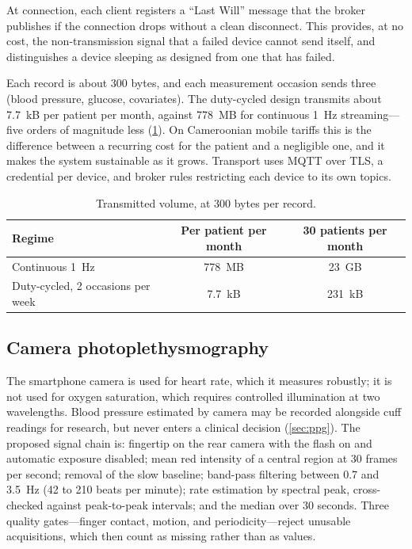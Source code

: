 At connection, each client registers a ``Last Will'' message that the broker publishes if the connection drops without a clean disconnect. This provides, at no cost, the non-transmission signal that a failed device cannot send itself, and distinguishes a device sleeping as designed from one that has failed.

Each record is about 300 bytes, and each measurement occasion sends three (blood pressure, glucose, covariates). The duty-cycled design transmits about 7.7~kB per patient per month, against 778~MB for continuous 1~Hz streaming---five orders of magnitude less (\cref{tab:data-volume}). On Cameroonian mobile tariffs this is the difference between a recurring cost for the patient and a negligible one, and it makes the system sustainable as it grows. Transport uses MQTT over TLS, a credential per device, and broker rules restricting each device to its own topics.

\begin{table}[htbp]
\centering\small
\caption{Transmitted volume, at 300 bytes per record.}\label{tab:data-volume}
\begin{tabularx}{\textwidth}{@{}X c c@{}}
\toprule
\textbf{Regime} & \textbf{Per patient per month} & \textbf{30 patients per month} \\
\midrule
Continuous 1~Hz & 778~MB & 23~GB \\
Duty-cycled, 2 occasions per week & 7.7~kB & 231~kB \\
\bottomrule
\end{tabularx}
\end{table}

\subsection{Camera photoplethysmography}\label{sec:camera-ppg}\label{sec:ppg-chain}\label{sec:ppg-validation}

The smartphone camera is used for heart rate, which it measures robustly; it is not used for oxygen saturation, which requires controlled illumination at two wavelengths. Blood pressure estimated by camera \parencite{liu2025ppg} may be recorded alongside cuff readings for research, but never enters a clinical decision (\cref{sec:ppg}). The proposed signal chain is: fingertip on the rear camera with the flash on and automatic exposure disabled; mean red intensity of a central region at 30 frames per second; removal of the slow baseline; band-pass filtering between 0.7 and 3.5~Hz (42 to 210 beats per minute); rate estimation by spectral peak, cross-checked against peak-to-peak intervals; and the median over 30 seconds. Three quality gates---finger contact, motion, and periodicity---reject unusable acquisitions, which then count as missing rather than as values.

